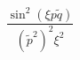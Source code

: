 \begin{equation}
\frac{\sin^2( \xi p \tilde{q})}{(\tilde{p}^2)^2 \xi^2}
\label{23a}
\end{equation}

